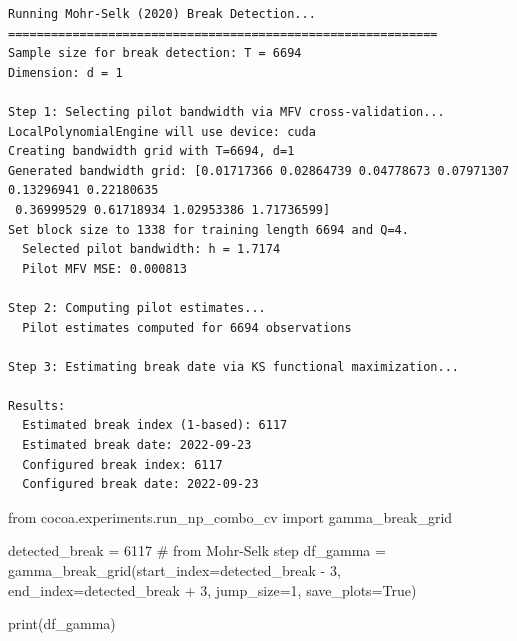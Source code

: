 \documentclass[
  letterpaper,
  DIV=11,
  numbers=noendperiod]{scrartcl}
\newenvironment{Shaded}{\begin{snugshade}}{\end{snugshade}}
\newcommand{\BuiltInTok}[1]{\textcolor[rgb]{0.00,0.23,0.31}{#1}}
\newcommand{\CommentTok}[1]{\textcolor[rgb]{0.37,0.37,0.37}{#1}}
\newcommand{\DecValTok}[1]{\textcolor[rgb]{0.68,0.00,0.00}{#1}}
\newcommand{\ImportTok}[1]{\textcolor[rgb]{0.00,0.46,0.62}{#1}}
\newcommand{\NormalTok}[1]{\textcolor[rgb]{0.00,0.23,0.31}{#1}}
\newcommand{\OperatorTok}[1]{\textcolor[rgb]{0.37,0.37,0.37}{#1}}
\newcommand{\VariableTok}[1]{\textcolor[rgb]{0.07,0.07,0.07}{#1}}
\begin{document}
\begin{verbatim}
Running Mohr-Selk (2020) Break Detection...
============================================================
Sample size for break detection: T = 6694
Dimension: d = 1

Step 1: Selecting pilot bandwidth via MFV cross-validation...
LocalPolynomialEngine will use device: cuda
Creating bandwidth grid with T=6694, d=1
Generated bandwidth grid: [0.01717366 0.02864739 0.04778673 0.07971307 0.13296941 0.22180635
 0.36999529 0.61718934 1.02953386 1.71736599]
Set block size to 1338 for training length 6694 and Q=4.
  Selected pilot bandwidth: h = 1.7174
  Pilot MFV MSE: 0.000813

Step 2: Computing pilot estimates...
  Pilot estimates computed for 6694 observations

Step 3: Estimating break date via KS functional maximization...

Results:
  Estimated break index (1-based): 6117
  Estimated break date: 2022-09-23
  Configured break index: 6117
  Configured break date: 2022-09-23
\end{verbatim}

\begin{Shaded}
\begin{Highlighting}[]
\ImportTok{from}\NormalTok{ cocoa.experiments.run\_np\_combo\_cv }\ImportTok{import}\NormalTok{ gamma\_break\_grid}


\NormalTok{detected\_break }\OperatorTok{=} \DecValTok{6117}  \CommentTok{\# from Mohr{-}Selk step}
\NormalTok{df\_gamma }\OperatorTok{=}\NormalTok{ gamma\_break\_grid(start\_index}\OperatorTok{=}\NormalTok{detected\_break }\OperatorTok{{-}} \DecValTok{3}\NormalTok{,}
\NormalTok{                              end\_index}\OperatorTok{=}\NormalTok{detected\_break }\OperatorTok{+} \DecValTok{3}\NormalTok{,}
\NormalTok{                              jump\_size}\OperatorTok{=}\DecValTok{1}\NormalTok{,}
\NormalTok{                              save\_plots}\OperatorTok{=}\VariableTok{True}\NormalTok{)}

\BuiltInTok{print}\NormalTok{(df\_gamma)}
\end{Highlighting}
\end{Shaded}
\end{document}
